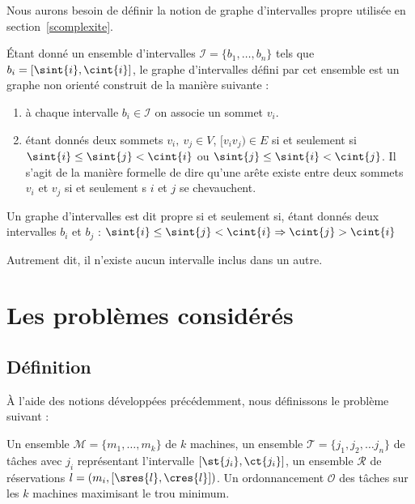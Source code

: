 \documentclass[a4paper,9pt]{report}
\begin{document}
Nous aurons besoin de définir la notion de graphe d'intervalles propre utilisée en
section~\ref{scomplexite}.

\begin{ndf}
    Étant donné un ensemble d'intervalles $\mathcal{I} = \{b_1, \dots, b_n\}$ tels que $b_i = [\sint{i},
    \cint{i}]$, le graphe d'intervalles défini par cet ensemble est un graphe non orienté construit de la
    manière suivante :
    \begin{enumerate}
        \item à chaque intervalle $b_i \in \mathcal{I}$ on associe un sommet $v_i$.
        \item étant donnés deux sommets $v_i,\ v_j \in V$, $[v_iv_j) \in E$ si et seulement si 
            $\sint{i} \leq \sint{j} < \cint{i}$ ou $\sint{j} \leq \sint{i} < \cint{j}$. Il s'agit
            de la manière formelle de dire qu'une arête existe entre deux sommets $v_i$ et $v_j$ si
            et seulement s $i$ et $j$ se chevauchent.
    \end{enumerate}

    Un graphe d'intervalles est dit propre si et seulement si, étant donnés deux intervalles $b_i$
    et $b_j$ : $\sint{i} \leq \sint{j} < \cint{i} \Rightarrow \cint{j} > \cint{i}$

    Autrement dit, il n'existe aucun intervalle inclus dans un autre.
\end{ndf}

\section{Les problèmes considérés}

\subsection{Définition}

À l'aide des notions développées précédemment, nous définissons le problème suivant :

\dfopt{\fisched}
{Un ensemble $\mathcal{M} = \{m_1, \dots, m_k\}$ de $k$ machines, un ensemble $\mathcal{T} = \{j_1,
    j_2, \dots j_n\}$ de tâches avec $j_i$ représentant l'intervalle $[\st{j_i}, \ct{j_i}]$, un
ensemble $\mathcal{R}$ de réservations $l = (m_i, [\sres{l}, \cres{l}])$.} 
{Un ordonnancement $\mathcal{O}$ des tâches sur les $k$ machines maximisant le trou
minimum.}
\end{document}
